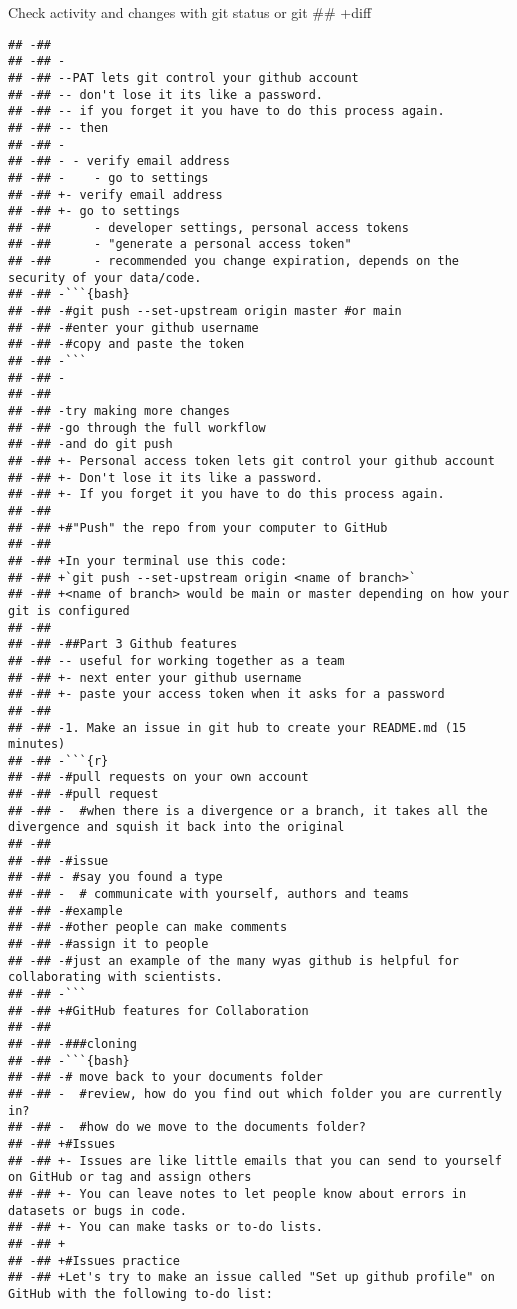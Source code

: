 \documentclass[ignorenonframetext,]{beamer}
\begin{document}
\begin{frame}[fragile]{Check activity and changes with git status or git
## +diff}
\begin{verbatim}
## -##  
## -## -
## -## --PAT lets git control your github account
## -## -- don't lose it its like a password. 
## -## -- if you forget it you have to do this process again.
## -## -- then 
## -## -
## -## - - verify email address
## -## -    - go to settings
## -## +- verify email address
## -## +- go to settings
## -##      - developer settings, personal access tokens
## -##      - "generate a personal access token"
## -##      - recommended you change expiration, depends on the security of your data/code. 
## -## -```{bash}
## -## -#git push --set-upstream origin master #or main
## -## -#enter your github username
## -## -#copy and paste the token
## -## -```
## -## - 
## -##  
## -## -try making more changes
## -## -go through the full workflow
## -## -and do git push
## -## +- Personal access token lets git control your github account
## -## +- Don't lose it its like a password. 
## -## +- If you forget it you have to do this process again.
## -##  
## -## +#"Push" the repo from your computer to GitHub
## -##  
## -## +In your terminal use this code: 
## -## +`git push --set-upstream origin <name of branch>`
## -## +<name of branch> would be main or master depending on how your git is configured
## -##  
## -## -##Part 3 Github features
## -## -- useful for working together as a team
## -## +- next enter your github username
## -## +- paste your access token when it asks for a password
## -##  
## -## -1. Make an issue in git hub to create your README.md (15 minutes)
## -## -```{r}
## -## -#pull requests on your own account 
## -## -#pull request 
## -## -  #when there is a divergence or a branch, it takes all the divergence and squish it back into the original
## -##  
## -## -#issue
## -## - #say you found a type
## -## -  # communicate with yourself, authors and teams 
## -## -#example
## -## -#other people can make comments
## -## -#assign it to people
## -## -#just an example of the many wyas github is helpful for collaborating with scientists.
## -## -```
## -## +#GitHub features for Collaboration
## -##  
## -## -###cloning
## -## -```{bash}
## -## -# move back to your documents folder
## -## -  #review, how do you find out which folder you are currently in? 
## -## -  #how do we move to the documents folder? 
## -## +#Issues
## -## +- Issues are like little emails that you can send to yourself on GitHub or tag and assign others
## -## +- You can leave notes to let people know about errors in datasets or bugs in code. 
## -## +- You can make tasks or to-do lists. 
## -## +
## -## +#Issues practice 
## -## +Let's try to make an issue called "Set up github profile" on GitHub with the following to-do list: 

\end{verbatim}
\end{frame}
\end{document}
